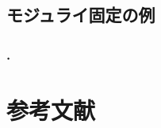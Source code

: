 \documentclass[
  a4paper,uplatex,dvipdfmx,11pt,
  xcolor = {dvipsnames,svgnames},
  hyperref ={colorlinks=true,citecolor=Navy,linkcolor=NavyBlue,urlcolor=purple}
]{beamer}
\begin{document}
\subsection{モジュライ固定の例}

\begin{frame}[plain]
  \frametitle{\thesubsection.\ \subsecname}







  
\end{frame}








  


\section{参考文献}
\begin{frame}
  \frametitle{\secname}
  \scriptsize
  \beamertemplatetextbibitems
  
  

  \nocite{Wess_SupersymmetrySupergravity_1992}

  \nocite{柴崎_背景_2021}
  \nocite{中野_磁化_2023}

\end{frame}


\setcounter{framenumber}{\value{Appendix}}
\end{document}
